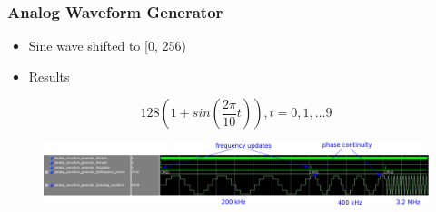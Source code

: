 \documentclass{beamer}
\begin{document}
\begin{frame}
\frametitle{Analog Waveform Generator}

\begin{itemize}
    \item Sine wave shifted to [0, 256)
    \item Results
\end{itemize}

\[ 128 (1 + sin(\frac{2 \pi}{10} t)), t = 0, 1, \ldots 9 \]

\begin{figure}[!htb]
    \centering
    \includegraphics[width=\linewidth]{analog.PNG}
\end{figure}

\end{frame}
\end{document}
